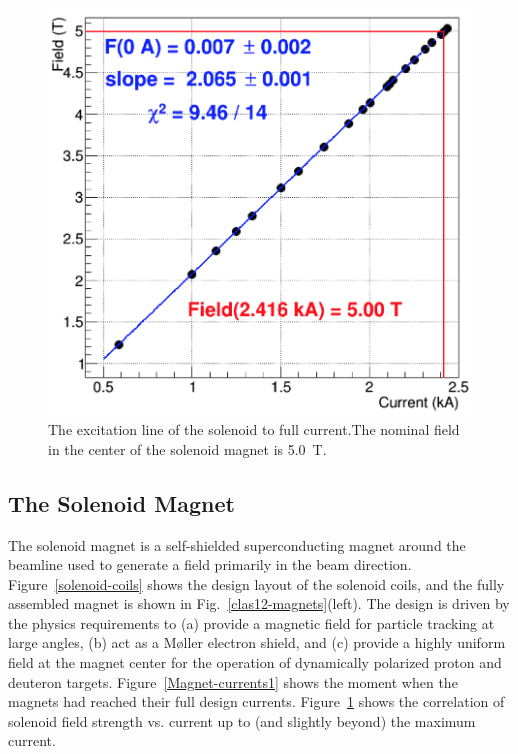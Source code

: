 \documentclass[final,3p,twocolumn]{elsarticle}
\begin{document}
\begin{figure}[h!]
\centerline{\includegraphics[width=0.95\columnwidth]{Solenoid-current.png}}
\caption{The excitation line of the solenoid to full current.The nominal field in the center of the solenoid magnet
  is 5.0~T.}
\label{Magnet-currents2}
\end{figure}

\subsection{The Solenoid Magnet}

The solenoid magnet is a self-shielded superconducting magnet around the beamline used to generate a field primarily
in the beam direction. Figure~\ref{solenoid-coils} shows the design layout of the solenoid coils, and the fully assembled
magnet is shown in Fig.~\ref{clas12-magnets}(left). The design is driven by the physics requirements to (a) provide a
magnetic field for particle tracking at large angles, (b) act as a M{\o}ller electron shield, and (c) provide a highly
uniform field at the magnet center for the operation of dynamically polarized proton and deuteron targets.
Figure~\ref{Magnet-currents1} shows the moment when the magnets had reached their full design currents.
Figure~\ref{Magnet-currents2} shows the correlation of solenoid field strength vs. current up to (and slightly beyond)
the maximum current.
\end{document}
